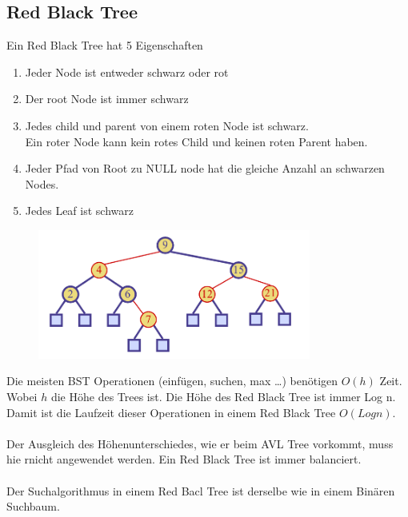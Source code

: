 \documentclass[a4paper,10pt]{report}
\begin{document}
\subsection{Red Black Tree}
Ein Red Black Tree hat 5 Eigenschaften
\begin{enumerate}
	\item
		Jeder Node ist entweder schwarz oder rot
	\item
		Der root Node ist immer schwarz
	\item
		Jedes child und parent von einem roten Node ist schwarz.\\
		Ein roter Node kann kein rotes Child und keinen roten Parent haben. 
	\item
		Jeder Pfad von Root zu NULL node hat die gleiche Anzahl an schwarzen Nodes.
	\item
		Jedes Leaf ist schwarz
\end{enumerate}
\begin{figure}[H]
	\begin{center}
  		\includegraphics[width=0.8\textwidth]{img/redblack.png}
	\end{center}
\end{figure}
Die meisten BST Operationen (einfügen, suchen, max \ldots) benötigen $O(h)$ Zeit. Wobei $h$ die Höhe des Trees ist. Die Höhe des Red Black Tree ist immer Log n. Damit ist die Laufzeit dieser Operationen in einem Red Black Tree $O(Logn)$.\\
\\
Der Ausgleich des Höhenunterschiedes, wie er beim AVL Tree vorkommt, muss hie rnicht angewendet werden. Ein Red Black Tree ist immer balanciert.  \\
\\
Der Suchalgorithmus in einem Red Bacl Tree ist derselbe wie in einem Binären Suchbaum.
\newpage
\end{document}
